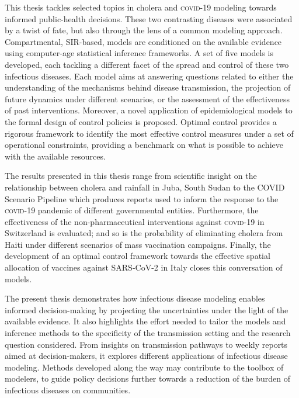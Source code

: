 This thesis tackles selected topics in cholera and \textsc{covid}-19 modeling towards informed public-health decisions. These two contrasting diseases were associated by a twist of fate, but also through the lens of a common modeling approach. Compartmental, SIR-based, models are conditioned on the available evidence using computer-age statistical inference frameworks. A set of five models is developed, each tackling a different facet of the spread and control of these two infectious diseases. Each model aims at answering questions related to either the understanding of the mechanisms behind disease transmission, the projection of future dynamics under different scenarios, or the assessment of the effectiveness of past interventions. Moreover, a novel application of epidemiological models to the formal design of control policies is proposed. Optimal control provides a rigorous framework to identify the most effective control measures under a set of operational constraints, providing a benchmark on what is possible to achieve with the available resources.

The results presented in this thesis range from scientific insight on the relationship between cholera and rainfall in Juba, South Sudan to the COVID Scenario Pipeline which produces reports used to inform the response to the \textsc{covid}-19 pandemic of different governmental entities. Furthermore, the effectiveness of the non-pharmaceutical interventions against \textsc{covid}-19 in Switzerland is evaluated; and so is the probability of eliminating cholera from Haiti under different scenarios of mass vaccination campaigns. Finally, the development of an optimal control framework towards the effective spatial allocation of vaccines against SARS-CoV-2 in Italy closes this conversation of models.

The present thesis demonstrates how infectious disease modeling enables informed decision-making by projecting the uncertainties under the light of the available evidence. It also highlights the effort needed to tailor the models and inference methods to the specificity of the transmission setting and the research question considered. From insights on transmission pathways to weekly reports aimed at decision-makers, it explores different applications of infectious disease modeling. Methods developed along the way may contribute to the toolbox of modelers, to guide policy decisions further towards a reduction of the burden of infectious diseases on communities.

